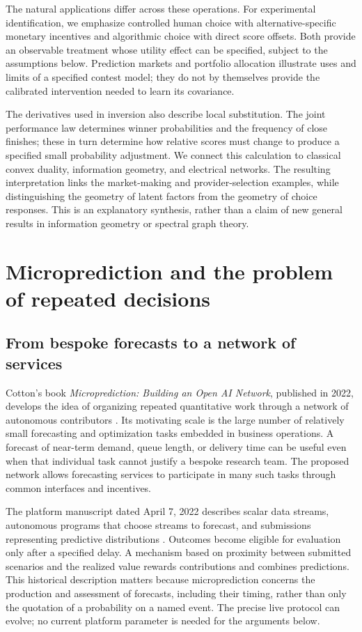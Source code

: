 \documentclass[11pt]{amsart}
\theoremstyle{definition}
\begin{document}
The natural applications differ across these operations. For experimental identification, we emphasize controlled human choice with alternative-specific monetary incentives and algorithmic choice with direct score offsets. Both provide an observable treatment whose utility effect can be specified, subject to the assumptions below. Prediction markets and portfolio allocation illustrate uses and limits of a specified contest model; they do not by themselves provide the calibrated intervention needed to learn its covariance.

The derivatives used in inversion also describe local substitution. The joint
performance law determines winner probabilities and the frequency of close
finishes; these in turn determine how relative scores must change to produce
a specified small probability adjustment. We connect this calculation to
classical convex duality, information geometry, and electrical networks.
The resulting interpretation links the market-making and provider-selection
examples, while distinguishing the geometry of latent factors from the geometry
of choice responses. This is an explanatory synthesis, rather than a claim of
new general results in information geometry or spectral graph theory.

\section{Microprediction and the problem of repeated decisions}

\subsection{From bespoke forecasts to a network of services}
Cotton's book \emph{Microprediction: Building an Open AI Network}, published in 2022, develops the idea of organizing repeated quantitative work through a network of autonomous contributors \cite{cottonbook}. Its motivating scale is the large number of relatively small forecasting and optimization tasks embedded in business operations. A forecast of near-term demand, queue length, or delivery time can be useful even when that individual task cannot justify a bespoke research team. The proposed network allows forecasting services to participate in many such tasks through common interfaces and incentives.

The platform manuscript dated April 7, 2022 describes scalar data streams, autonomous programs that choose streams to forecast, and submissions representing predictive distributions \cite{cottonplatform}. Outcomes become eligible for evaluation only after a specified delay. A mechanism based on proximity between submitted scenarios and the realized value rewards contributions and combines predictions. This historical description matters because microprediction concerns the production and assessment of forecasts, including their timing, rather than only the quotation of a probability on a named event. The precise live protocol can evolve; no current platform parameter is needed for the arguments below.
\end{document}
